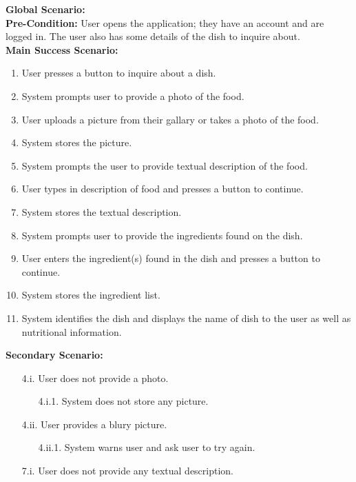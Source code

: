 \documentclass[]{article}
\begin{document}
\begin{enumerate}[{\bf BE1.}]
		{\bf Global Scenario:} \\
		\textbf{Pre-Condition:} User opens the application; they have an account and are logged in. The user also has some details of the dish to inquire about. \\
		\textbf{Main Success Scenario:} 
		\begin{enumerate}[{1.}]
			\item User presses a button to inquire about a dish.
			\item System prompts user to provide a photo of the food.
			\item User uploads a picture from their gallary or takes a photo of the food.
			\item System stores the picture.
			\item System prompts the user to provide textual description of the food.
			\item User types in description of food and presses a button to continue.
			\item System stores the textual description.
			\item System prompts user to provide the ingredients found on the dish.
			\item User enters the ingredient(s) found in the dish and presses a button to continue.
			\item System stores the ingredient list.
			\item System identifies the dish and displays the name of dish to the user as well as nutritional information.
		\end{enumerate}
		\textbf{Secondary Scenario:}
		\begin{enumerate}
			\item[4.i.] User does not provide a photo.
			\begin{enumerate}
				\item[4.i.1.] System does not store any picture.
			\end{enumerate}
			\item[4.ii.] User provides a blury picture.
			\begin{enumerate}
				\item[4.ii.1.] System warns user and ask user to try again.
			\end{enumerate}
		\end{enumerate}
		\begin{enumerate}
			\item[7.i.] User does not provide any textual description.
			\begin{enumerate}

\end{enumerate}
\end{enumerate}
\end{enumerate}
\end{document}

